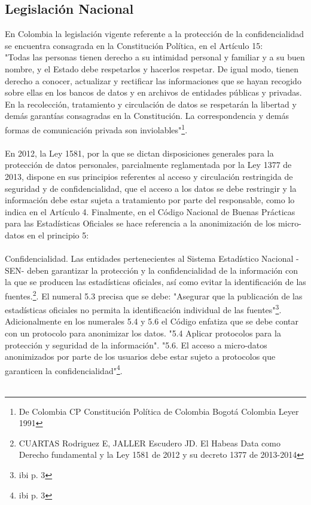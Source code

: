 \documentclass[a4paper,openright,12pt]{book}
\theoremstyle{definition}
\theoremstyle{remark}
\begin{document}
\subsection{Legislación Nacional}
En Colombia la legislación vigente referente a la protección de la confidencialidad se encuentra consagrada en la Constitución Política, en el Artículo 15:\\
"Todas las personas tienen derecho a su intimidad personal y familiar y a su buen nombre, y el Estado debe respetarlos y hacerlos respetar. De igual modo, tienen derecho a conocer, actualizar y rectificar las informaciones que se hayan recogido sobre ellas en los bancos de datos y en archivos de entidades públicas y privadas. En la recolección, tratamiento y circulación de datos se respetarán la libertad y demás garantías consagradas en la Constitución. La correspondencia y demás formas de comunicación privada son inviolables"\footnote{De Colombia CP Constitución Política de Colombia Bogotá Colombia Leyer 1991}.\\\\
En 2012, la Ley 1581, por la que se dictan disposiciones generales para la protección de datos personales, parcialmente reglamentada por la Ley 1377 de 2013, dispone en sus principios referentes al acceso y circulación restringida de seguridad y de confidencialidad, que el acceso a los datos se debe restringir y la información debe estar sujeta a tratamiento por parte del responsable, como lo indica en el Artículo 4. Finalmente, en el Código Nacional de Buenas Prácticas para las Estadísticas Oficiales se hace referencia a la anonimización de los micro-datos en el principio 5:\\\\
Confidencialidad. Las entidades pertenecientes al Sistema Estadístico Nacional -SEN- deben garantizar la protección y la confidencialidad de la información con la que se producen las estadísticas oficiales, así como evitar la identificación de las fuentes.\footnote{CUARTAS Rodriguez E, JALLER Escudero JD. El Habeas Data como Derecho fundamental y la Ley 1581 de 2012 y su decreto 1377 de 2013-2014}. El numeral 5.3  precisa que se debe:
"Asegurar que la publicación de las estadísticas oficiales no permita la identificación individual de las fuentes"\footnote{ibi p. 3}.
Adicionalmente en los numerales 5.4 y 5.6 el Código enfatiza que se debe contar con un protocolo para anonimizar los datos.
"5.4 Aplicar protocolos para la protección y seguridad de la información". "5.6. El acceso a micro-datos anonimizados por parte de los usuarios debe estar sujeto a protocolos que garanticen la confidencialidad"\footnote{ibi p. 3}.\\\\
\end{document}
